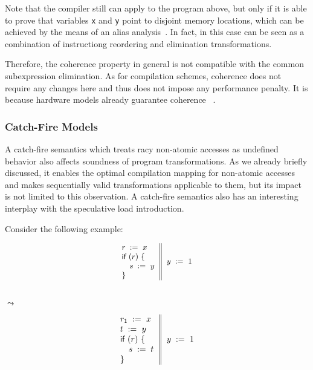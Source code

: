 Note that the compiler still can apply \CSE to the program above, 
but only if it is able to prove that variables \texttt{x} and \texttt{y} 
point to disjoint memory locations, which can be achieved 
by the means of an alias analysis~\cite{Diwan-al:PLDI1998}.
In fact, in this case \CSE can be seen as a combination 
of instructiong reordering and elimination transformations.  

Therefore, the coherence property in general is not compatible 
with the common subexpression elimination.
As for compilation schemes, coherence does not require 
any changes here and thus does not impose any performance penalty.
It is because hardware models already guarantee coherence%
~\cite{Alglave-al:TOPLAS14, Sarkar-al:PLDI11, Sewell-al:CACM10, Lahav-al:PLDI17}. 

\subsubsection{Catch-Fire Models}
\label{sec:analysis:ub}

A catch-fire semantics which treats racy non-atomic 
accesses as undefined behavior also affects  
soundness of program transformations. 
As we already briefly discussed, it enables 
the optimal compilation mapping for non-atomic accesses and 
makes sequentially valid transformations applicable 
to them, but its impact is not limited to this observation. 
A catch-fire semantics also has an interesting interplay
with the speculative load introduction.

Consider the following example:

\begin{minipage}{0.43\linewidth}
\begin{equation*}
\small
\inarrII{
  \readInst{}{r}{x}      \\
  \kw{if} {(r)} ~\{      \\
  \quad\readInst{}{s}{y} \\
  \}

}{
  \writeInst{}{y}{1}       \\
}
\label{ex:sliA}
\end{equation*}
\end{minipage}\hfill%
\begin{minipage}{0.09\linewidth}
\Large~\\ $\leadsto$
\end{minipage}\hfill%
\begin{minipage}{0.43\linewidth}
\begin{equation*}
\inarrII{
  \readInst{}{r_1}{x}      \\
  \readInst{}{t}{y}        \\
  \kw{if} {(r)} ~\{        \\
  \quad\assignInst{s}{t}   \\
  \}

}{
  \writeInst{}{y}{1}       \\
}
\label{ex:sliB}
\end{equation*}
\end{minipage}
 
